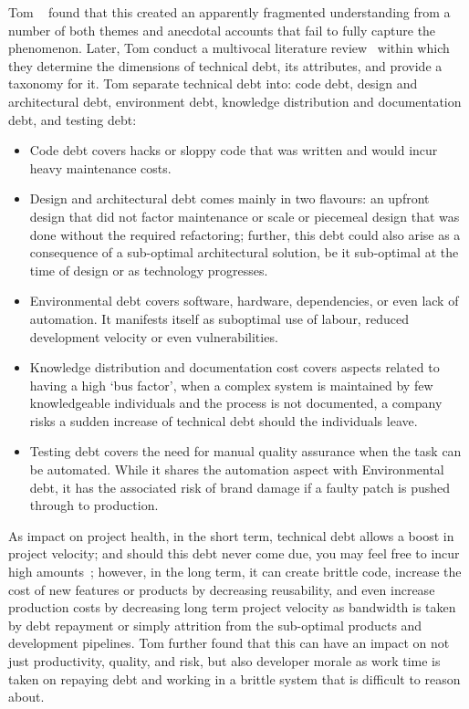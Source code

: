 Tom \etal~\cite{tom2012consolidated} found that this created an apparently
fragmented understanding from a number of both themes and anecdotal accounts
that fail to fully capture the phenomenon. Later, Tom \etal conduct a multivocal
literature review~\cite{tom2013exploration} within which they determine the
dimensions of technical debt, its attributes, and provide a taxonomy for it. Tom
\etal separate technical debt into: code debt, design and architectural debt,
environment debt, knowledge distribution and documentation debt, and testing
debt:
\begin{itemize}
    \item Code debt covers hacks or sloppy code that was written and would incur
    heavy maintenance costs.
    \item Design and architectural debt comes mainly in two flavours: an upfront
    design that did not factor maintenance or scale or piecemeal design that was
    done without the required refactoring; further, this debt could also arise
    as a consequence of a sub-optimal architectural solution, be it sub-optimal
    at the time of design or as technology progresses.
    \item Environmental debt covers software, hardware, dependencies, or even
    lack of automation. It manifests itself as suboptimal use of labour, reduced
    development velocity or even vulnerabilities.
    \item Knowledge distribution and documentation cost covers aspects related
    to having a high `bus factor', when a complex system is maintained by few
    knowledgeable individuals and the process is not documented, a company risks
    a sudden increase of technical debt should the individuals leave.
    \item Testing debt covers the need for manual quality assurance when the
    task can be automated. While it shares the automation aspect with
    Environmental debt, it has the associated risk of brand damage if a faulty
    patch is pushed through to production.
\end{itemize}  

As impact on project health, in the short term, technical debt allows a boost in
project velocity; and should this debt never come due, you may feel free to
incur high amounts~\cite{tom2013exploration}; however, in the long term, it can
create brittle code, increase the cost of new features or products by decreasing
reusability, and even increase production costs by decreasing long term project
velocity as bandwidth is taken by debt repayment or simply attrition from the
sub-optimal products and development pipelines. Tom \etal further found that
this can have an impact on not just productivity, quality, and risk, but also
developer morale as work time is taken on repaying debt and working in a brittle
system that is difficult to reason about.

